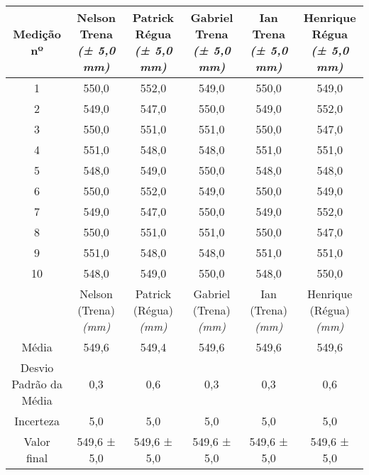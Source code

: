 \documentclass{article}
\begin{document}
\begin{table}[h!]
\centering
\begin{tabular}{c c c c c c }
\toprule
Medição nº & \shortstack{Nelson\\Trena\\\textit{(± 5,0 mm)}} & \shortstack{Patrick\\Régua\\\textit{(± 5,0 mm)}} & \shortstack{Gabriel\\Trena\\\textit{(± 5,0 mm)}} & \shortstack{Ian\\Trena\\\textit{(± 5,0 mm)}} & \shortstack{Henrique\\Régua\\\textit{(± 5,0 mm)}}\\
\midrule
1 & 550,0 & 552,0 & 549,0 & 550,0 & 549,0\\
2 & 549,0 & 547,0 & 550,0 & 549,0 & 552,0\\
3 & 550,0 & 551,0 & 551,0 & 550,0 & 547,0\\
4 & 551,0 & 548,0 & 548,0 & 551,0 & 551,0\\
5 & 548,0 & 549,0 & 550,0 & 548,0 & 548,0\\
6 & 550,0 & 552,0 & 549,0 & 550,0 & 549,0\\
7 & 549,0 & 547,0 & 550,0 & 549,0 & 552,0\\
8 & 550,0 & 551,0 & 551,0 & 550,0 & 547,0\\
9 & 551,0 & 548,0 & 548,0 & 551,0 & 551,0\\
10 & 548,0 & 549,0 & 550,0 & 548,0 & 550,0\\
\midrule
&\shortstack{Nelson\\(Trena)\\\textit{(mm)}} & \shortstack{Patrick\\(Régua)\\\textit{(mm)}} & \shortstack{Gabriel\\(Trena)\\\textit{(mm)}} & \shortstack{Ian\\(Trena)\\\textit{(mm)}} & \shortstack{Henrique\\(Régua)\\\textit{(mm)}}\\
\midrule
Média & 549,6 & 549,4 & 549,6 & 549,6 & 549,6\\[3pt]
\shortstack{Desvio\\Padrão da\\Média} & 0,3 & 0,6 & 0,3 & 0,3 & 0,6\\[3pt]
Incerteza & 5,0 & 5,0 & 5,0 & 5,0 & 5,0\\[3pt]
Valor final & 549,6 ± 5,0 & 549,6 ± 5,0 & 549,6 ± 5,0 & 549,6 ± 5,0 & 549,6 ± 5,0\\[3pt]
\bottomrule
\end{tabular}
\end{table}
\end{document}
